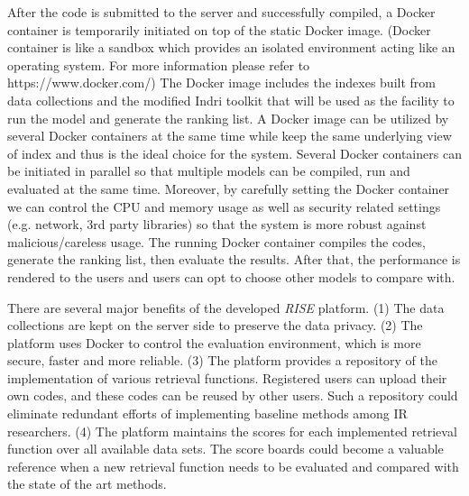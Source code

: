After the code is submitted to the server and successfully 
compiled, a Docker container 
is temporarily initiated on top of the static Docker image. 
(Docker container is like a sandbox which provides an isolated 
environment acting like an operating system. For more information 
please refer to https://www.docker.com/) 
The Docker image includes the indexes built from data collections 
and the modified Indri toolkit that will be used as the facility to 
run the model and generate the ranking list. 
A Docker image can be utilized by several Docker containers at the 
same time while keep the same underlying view of index and thus is 
the ideal choice for the system. 
Several Docker containers can be initiated in 
parallel so that multiple models can be compiled, run and evaluated 
at the same time. Moreover, by carefully setting the Docker container 
we can control the CPU and memory usage as well as security 
related settings (e.g. network, 3rd party libraries) so that the 
system is more robust against malicious/careless usage. 
The running Docker container compiles the codes, generate the ranking 
list, then evaluate the results. After that, the performance is 
rendered to the users and users can opt to choose other models to compare with. 



There are several major benefits of the developed {\em RISE} platform.  
(1) The data collections are kept on the server side to preserve
the data privacy.  (2) The platform uses Docker to control the 
evaluation environment, which is more secure, faster and more 
reliable.  
(3) The platform provides 
a repository of the implementation of various retrieval functions. 
Registered users can upload their own codes, and these codes can be 
reused by other users.  Such a repository could eliminate redundant 
efforts of implementing baseline methods among IR researchers. 
(4) The platform maintains the scores for each implemented retrieval 
function over all available data sets.  The score boards could become
a valuable reference when a new retrieval function needs to be evaluated
and compared with the state of the art methods. 


